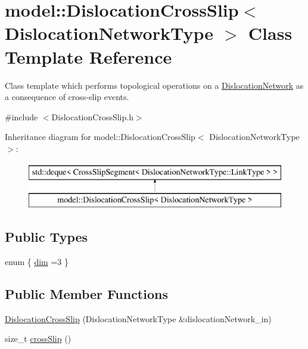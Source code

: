 \hypertarget{classmodel_1_1_dislocation_cross_slip}{}\section{model\+:\+:Dislocation\+Cross\+Slip$<$ Dislocation\+Network\+Type $>$ Class Template Reference}
\label{classmodel_1_1_dislocation_cross_slip}


Class template which performs topological operations on a \hyperlink{classmodel_1_1_dislocation_network}{Dislocation\+Network} as a consequence of cross-\/slip events.  




{\ttfamily \#include $<$Dislocation\+Cross\+Slip.\+h$>$}

Inheritance diagram for model\+:\+:Dislocation\+Cross\+Slip$<$ Dislocation\+Network\+Type $>$\+:\begin{figure}[H]
\begin{center}
\leavevmode
\includegraphics[height=2.000000cm]{classmodel_1_1_dislocation_cross_slip}
\end{center}
\end{figure}
\subsection*{Public Types}
\begin{DoxyCompactItemize}
\item 
enum \{ \hyperlink{classmodel_1_1_dislocation_cross_slip_ae34568d976bb0bcd6f4e7ab83ed49493a7c1725df0c0c79734d9a3450d831df84}{dim} =3
 \}
\end{DoxyCompactItemize}
\subsection*{Public Member Functions}
\begin{DoxyCompactItemize}
\item 
\hyperlink{classmodel_1_1_dislocation_cross_slip_ad3d1f1ab05202e56be6c732fa738c4bc}{Dislocation\+Cross\+Slip} (Dislocation\+Network\+Type \&dislocation\+Network\+\_\+in)
\item 
size\+\_\+t \hyperlink{classmodel_1_1_dislocation_cross_slip_a42081551269efea0b280d566da1c4dc4}{cross\+Slip} ()
\end{DoxyCompactItemize}
